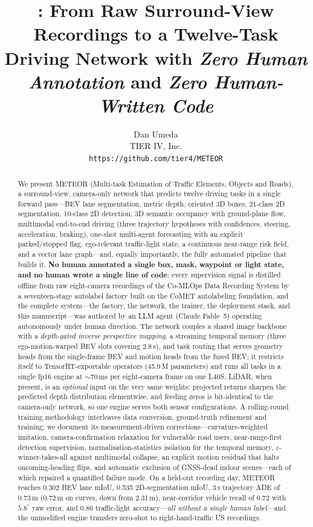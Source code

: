 \documentclass[10pt,twocolumn]{article}
\title{\textbf{\meteor{}: From Raw Surround-View Recordings to a Twelve-Task\\
Driving Network with \emph{Zero Human Annotation} and \emph{Zero Human-Written Code}}}
\author{Dan Umeda\\
TIER IV, Inc.\\
\texttt{https://github.com/tier4/METEOR}}
\date{}
\newcommand{\meteor}{METEOR}
\begin{document}
\maketitle

\begin{abstract}
We present \meteor{} (Multi-task Estimation of Traffic Elements, Objects and
Roads), a surround-view, camera-only network that predicts twelve driving
tasks in a single forward pass---BEV lane segmentation, metric depth,
oriented 3D boxes, 21-class 2D segmentation, 10-class 2D detection, 3D
semantic occupancy with ground-plane flow, multimodal end-to-end driving
(three trajectory hypotheses with confidences, steering, acceleration,
braking), one-shot multi-agent forecasting with an explicit parked/stopped
flag, ego-relevant traffic-light state, a continuous near-range risk field,
and a vector lane graph---and, equally importantly, the fully automated
pipeline that builds it. \textbf{No human annotated a single box, mask,
waypoint or light state, and no human wrote a single line of code}: every
supervision signal is distilled offline from raw eight-camera recordings of
the Co-MLOps Data Recording System by a seventeen-stage autolabel factory
built on the CoMET autolabeling foundation, and the complete system---the
factory, the network, the trainer, the deployment stack, and this
manuscript---was authored by an LLM agent (Claude Fable~5) operating
autonomously under human direction. The network couples a shared image
backbone with a \emph{depth-gated inverse perspective mapping}, a streaming
temporal memory (three ego-motion-warped BEV slots covering 2.8\,s), and
task routing that serves geometry heads from the single-frame BEV and motion
heads from the fused BEV; it restricts itself to TensorRT-exportable
operators (45.9\,M parameters) and runs all tasks in a single fp16 engine at
$\sim$70\,ms per eight-camera frame on one L40S. LiDAR, when present, is an
\emph{optional} input on the very same weights: projected returns sharpen
the predicted depth distribution elementwise, and feeding zeros is
bit-identical to the camera-only network, so one engine serves both sensor
configurations. A rolling-round training methodology interleaves data
conversion, ground-truth refinement and training; we document its
measurement-driven corrections---curvature-weighted imitation,
camera-confirmation relaxation for vulnerable road users, near-range-first
detection supervision, normalisation-statistics isolation for the temporal
memory, $\varepsilon$-winner-takes-all against multimodal collapse, an
explicit motion residual that halts oncoming-heading flips, and automatic
exclusion of GNSS-dead indoor scenes---each of which repaired a quantified
failure mode. On a held-out recording day, \meteor{} reaches 0.302 BEV lane
mIoU, 0.535 2D-segmentation mIoU, 3\,s trajectory ADE of 0.73\,m (0.72\,m
on curves, down from 2.31\,m), near-corridor vehicle recall of 0.72 with
$5.8^\circ$ yaw error, and 0.86 traffic-light accuracy---\emph{all without
a single human label}---and the unmodified engine transfers zero-shot to
right-hand-traffic US recordings.
\end{abstract}
\end{document}

